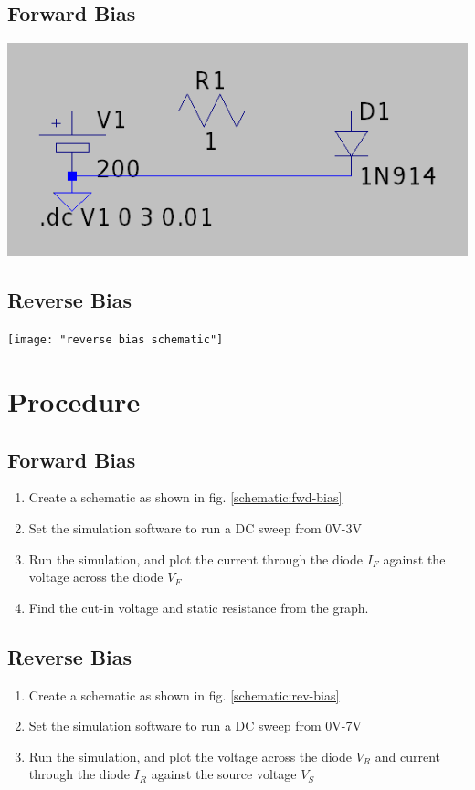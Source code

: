 \documentclass{article}
\begin{document}
	\subsection{Forward Bias}
		\begin{center}
			\label{schematic:fwd-bias}
			\includegraphics[width=0.7\linewidth]{"forward bias schematic"}
		\end{center}		
	\subsection{Reverse Bias}
		\begin{center}
			\label{schematic:rev-bias}
			\texttt{[image: "reverse bias 	schematic"]}
		\end{center}		
	\section{Procedure}
	\subsection{Forward Bias}
	\begin{enumerate}
		\item Create a schematic as shown in fig. \ref{schematic:fwd-bias}
		\item Set the simulation software to run a DC sweep from 0V-3V
		\item Run the simulation, and plot the current through the diode $ I_F $ against the voltage across the diode $ V_F $
		\item Find the cut-in voltage and static resistance from the graph.
	\end{enumerate}
	\subsection{Reverse Bias}
	\begin{enumerate}
		\item Create a schematic as shown in fig. \ref{schematic:rev-bias}
		\item Set the simulation software to run a DC sweep from 0V-7V
		\item Run the simulation, and plot the voltage across the diode $ V_R $ and current through the diode $ I_R $ against the source voltage $ V_S $
	\end{enumerate}
\end{document}
